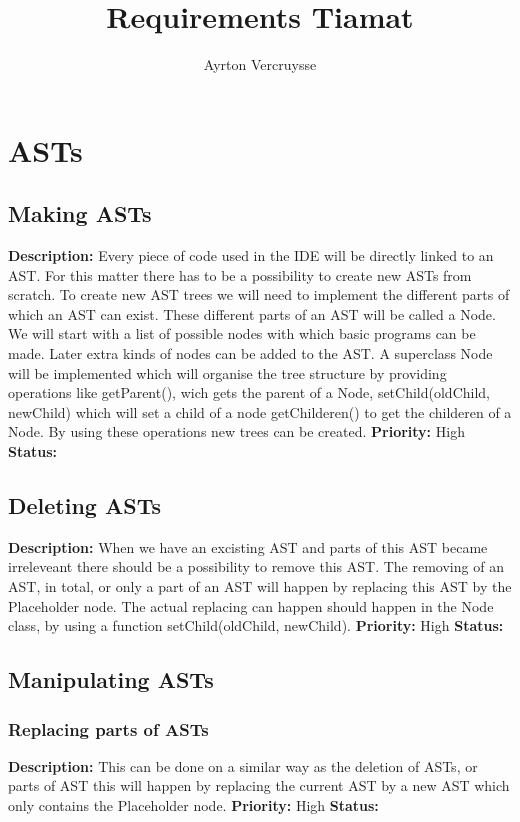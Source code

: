 \documentclass{article}
\title{Requirements Tiamat}
\author{Ayrton Vercruysse}
\begin{document}
\maketitle
\tableofcontents
\section{ASTs}
\subsection{Making ASTs}
\textbf{Description: } Every piece of code used in the IDE will be directly linked to an AST. For this matter there has to be a possibility to create new ASTs from scratch.
To create new AST trees we will need to implement the different parts of which an AST can exist. These different parts of an AST will be called a Node. We will start with
a list of possible nodes with which basic programs can be made. Later extra kinds of nodes can be added to the AST.
A superclass Node will be implemented which will organise the tree structure by providing operations like getParent(), wich gets the parent of a Node, setChild(oldChild, newChild)
which will set a child of a node getChilderen() to get the childeren of a Node. By using these operations new trees can be created.
 \newline
\textbf{Priority:} High \newline
\textbf{Status: } \newline
\subsection{Deleting ASTs}
\textbf{Description: }When we have an excisting AST and parts of this AST became irreleveant there should be a possibility to remove this AST. The removing of an AST, in total,
or only a part of an AST will happen by replacing this AST by the Placeholder node. The actual replacing can happen should happen in the Node class, by using a function
setChild(oldChild, newChild). \newline
\textbf{Priority:} High \newline
\textbf{Status: } \newline
\subsection{Manipulating ASTs}
\subsubsection{Replacing parts of ASTs}
\textbf{Description: }This can be done on a similar way as the deletion of ASTs, or parts of AST this will happen by replacing the current AST by a new AST which only contains
the Placeholder node. \newline
\textbf{Priority:} High \newline
\textbf{Status: } \newline
\end{document}
